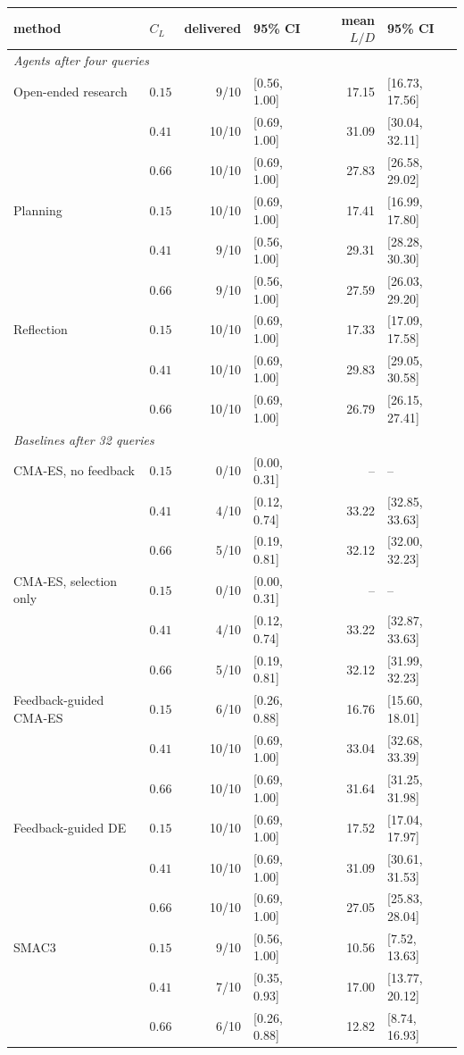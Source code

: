 \begin{tabular}{llrlrl}
\toprule
method & $C_L$ & delivered & 95\% CI & mean $L/D$ & 95\% CI \\
\midrule
\multicolumn{6}{l}{\emph{Agents after four queries}} \\
Open-ended research & $0.15$ & 9/10 & [0.56, 1.00] & 17.15 & [16.73, 17.56] \\
 & $0.41$ & 10/10 & [0.69, 1.00] & 31.09 & [30.04, 32.11] \\
 & $0.66$ & 10/10 & [0.69, 1.00] & 27.83 & [26.58, 29.02] \\
Planning & $0.15$ & 10/10 & [0.69, 1.00] & 17.41 & [16.99, 17.80] \\
 & $0.41$ & 9/10 & [0.56, 1.00] & 29.31 & [28.28, 30.30] \\
 & $0.66$ & 9/10 & [0.56, 1.00] & 27.59 & [26.03, 29.20] \\
Reflection & $0.15$ & 10/10 & [0.69, 1.00] & 17.33 & [17.09, 17.58] \\
 & $0.41$ & 10/10 & [0.69, 1.00] & 29.83 & [29.05, 30.58] \\
 & $0.66$ & 10/10 & [0.69, 1.00] & 26.79 & [26.15, 27.41] \\
\midrule
\multicolumn{6}{l}{\emph{Baselines after 32 queries}} \\
CMA-ES, no feedback & $0.15$ & 0/10 & [0.00, 0.31] & -- & -- \\
 & $0.41$ & 4/10 & [0.12, 0.74] & 33.22 & [32.85, 33.63] \\
 & $0.66$ & 5/10 & [0.19, 0.81] & 32.12 & [32.00, 32.23] \\
CMA-ES, selection only & $0.15$ & 0/10 & [0.00, 0.31] & -- & -- \\
 & $0.41$ & 4/10 & [0.12, 0.74] & 33.22 & [32.87, 33.63] \\
 & $0.66$ & 5/10 & [0.19, 0.81] & 32.12 & [31.99, 32.23] \\
Feedback-guided CMA-ES & $0.15$ & 6/10 & [0.26, 0.88] & 16.76 & [15.60, 18.01] \\
 & $0.41$ & 10/10 & [0.69, 1.00] & 33.04 & [32.68, 33.39] \\
 & $0.66$ & 10/10 & [0.69, 1.00] & 31.64 & [31.25, 31.98] \\
Feedback-guided DE & $0.15$ & 10/10 & [0.69, 1.00] & 17.52 & [17.04, 17.97] \\
 & $0.41$ & 10/10 & [0.69, 1.00] & 31.09 & [30.61, 31.53] \\
 & $0.66$ & 10/10 & [0.69, 1.00] & 27.05 & [25.83, 28.04] \\
SMAC3 & $0.15$ & 9/10 & [0.56, 1.00] & 10.56 & [7.52, 13.63] \\
 & $0.41$ & 7/10 & [0.35, 0.93] & 17.00 & [13.77, 20.12] \\
 & $0.66$ & 6/10 & [0.26, 0.88] & 12.82 & [8.74, 16.93] \\
\bottomrule
\end{tabular}
